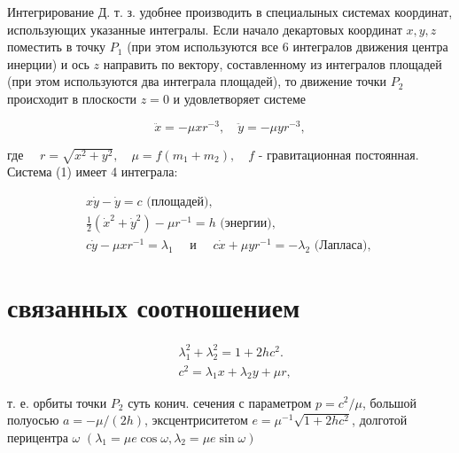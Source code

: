\documentclass[10pt]{article}
\begin{document}
Интегрирование Д. т. з. удобнее производить в специалыных системах координат, использующих указанные интегралы. Если начало декартовых координат $x, y, z$ поместить в точку $P_{1}$ (при этом используются все 6 интегралов движения центра инерции) и ось $z$ направить по вектору, составленному из интегралов площадей (при этом используются два интеграла площадей), то движение точки $P_{2}$ происходит в плоскости $z=0$ и удовлетворяет системе



\[

\ddot{x}=-\mu x r^{-3}, \quad \ddot{y}=-\mu y r^{-3},

\]



где $\quad r=\sqrt{x^{2}+y^{2}}, \quad \mu=f\left(m_{1}+m_{2}\right), \quad f$ - гравитационная постоянная. Система (1) имеет 4 интеграла:



\[

\begin{gathered}

x \dot{y}-\dot{y}=c \text { (площадей), } \\

\frac{1}{2}\left(\dot{x}^{2}+\dot{y}^{2}\right)-\mu r^{-1}=h \text { (энергии), } \\

c \dot{y}-\mu x r^{-1}=\lambda_{1} \quad \text { и } \quad c \dot{x}+\mu y r^{-1}=-\lambda_{2} \text { (Лапласа), }

\end{gathered}

\]



\section{связанных соотношением}

\[

\begin{aligned}

& \lambda_{1}^{2}+\lambda_{2}^{2}=1+2 h c^{2} . \\

& c^{2}=\lambda_{1} x+\lambda_{2} y+\mu r,

\end{aligned}

\]



т. е. орбиты точки $P_{2}$ суть конич. сечения с параметром $p=c^{2} / \mu$, большой полуосью $a=-\mu /(2 h)$, эксцентриситетом $e=\mu^{-1} \sqrt{1+2 h c^{2}}$, долготой перицентра $\omega$ $\left(\lambda_{1}=\mu e \cos \omega, \lambda_{2}=\mu e \sin \omega\right)$
\end{document}
